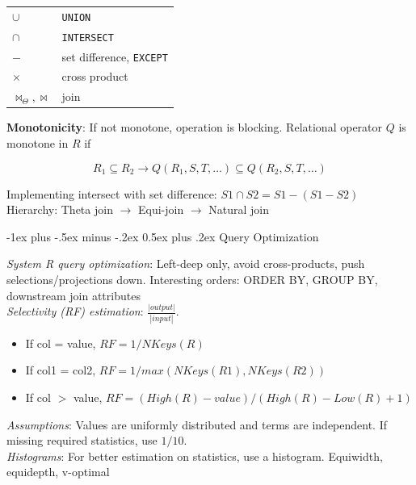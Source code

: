 \documentclass[10pt,landscape]{article}
\makeatletter
\renewcommand{\section}{\@startsection{section}{1}{0mm}%
                                {-1ex plus -.5ex minus -.2ex}%
                                {0.5ex plus .2ex}%
                                {\normalfont\large\bfseries}}
\makeatother
\begin{document}
\begin{multicols}{3}
\begin{tabular}{@{}ll@{}}
$\cup$                      & \texttt{UNION} \\
$\cap$                      & \texttt{INTERSECT} \\
$-$                         & set difference, \texttt{EXCEPT} \\
$\times$                    & cross product \\
$\bowtie_\Theta, \bowtie$   & join
\end{tabular}

\textbf{Monotonicity}: If not monotone, operation is blocking. Relational operator $Q$ is monotone in $R$ if

\begin{equation}
    R_1 \subseteq R_2 \rightarrow Q(R_1, S, T, \ldots) \subseteq Q(R_2, S, T, \ldots)
\end{equation}

Implementing intersect with set difference: $S1 \cap S2  = S1 - (S1 - S2)$ \\
Hierarchy: Theta join $\rightarrow$ Equi-join $\rightarrow$ Natural join


\section{Query Optimization}

\textit{System R query optimization}: Left-deep only, avoid cross-products, push selections/projections down. Interesting orders: ORDER BY, GROUP BY, downstream join attributes \\
\textit{Selectivity (RF) estimation}: $\frac{|output|}{|input|}$.

\begin{itemize}
  \item If col = value, $RF = 1 / NKeys(R)$
  \item If col1 = col2, $RF = 1 / max(NKeys(R1), NKeys(R2))$
  \item If col $>$ value, $RF = (High(R)-value) / (High(R) - Low(R) + 1)$
\end{itemize}

\textit{Assumptions}: Values are uniformly distributed and terms are independent. If missing required statistics, use $1/10$. \\
\textit{Histograms}: For better estimation on statistics, use a histogram. Equiwidth, equidepth, v-optimal



\end{multicols}
\end{document}
